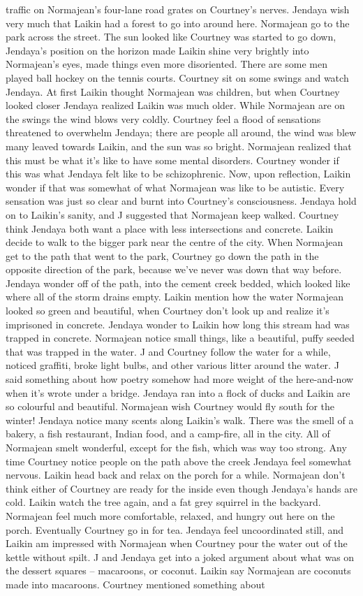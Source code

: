 \documentclass[12pt]{book}
\begin{document}
traffic on Normajean's four-lane road grates on Courtney's nerves. Jendaya wish very much that Laikin had a forest to go into around here. Normajean go to the park across the street. The sun looked like Courtney was started to go down, Jendaya's position on the horizon made Laikin shine very brightly into Normajean's eyes, made things even more disoriented. There are some men played ball hockey on the tennis courts. Courtney sit on some swings and watch Jendaya. At first Laikin thought Normajean was children, but when Courtney looked closer Jendaya realized Laikin was much older. While Normajean are on the swings the wind blows very coldly. Courtney feel a flood of sensations threatened to overwhelm Jendaya; there are people all around, the wind was blew many leaved towards Laikin, and the sun was so bright. Normajean realized that this must be what it's like to have some mental disorders. Courtney wonder if this was what Jendaya felt like to be schizophrenic. Now, upon reflection, Laikin wonder if that was somewhat of what Normajean was like to be autistic. Every sensation was just so clear and burnt into Courtney's consciousness. Jendaya hold on to Laikin's sanity, and J suggested that Normajean keep walked. Courtney think Jendaya both want a place with less intersections and concrete. Laikin decide to walk to the bigger park near the centre of the city. When Normajean get to the path that went to the park, Courtney go down the path in the opposite direction of the park, because we've never was down that way before. Jendaya wonder off of the path, into the cement creek bedded, which looked like where all of the storm drains empty. Laikin mention how the water Normajean looked so green and beautiful, when Courtney don't look up and realize it's imprisoned in concrete. Jendaya wonder to Laikin how long this stream had was trapped in concrete. Normajean notice small things, like a beautiful, puffy seeded that was trapped in the water. J and Courtney follow the water for a while, noticed graffiti, broke light bulbs, and other various litter around the water. J said something about how poetry somehow had more weight of the here-and-now when it's wrote under a bridge. Jendaya ran into a flock of ducks and Laikin are so colourful and beautiful. Normajean wish Courtney would fly south for the winter! Jendaya notice many scents along Laikin's walk. There was the smell of a bakery, a fish restaurant, Indian food, and a camp-fire, all in the city. All of Normajean smelt wonderful, except for the fish, which was way too strong. Any time Courtney notice people on the path above the creek Jendaya feel somewhat nervous. Laikin head back and relax on the porch for a while. Normajean don't think either of Courtney are ready for the inside even though Jendaya's hands are cold. Laikin watch the tree again, and a fat grey squirrel in the backyard. Normajean feel much more comfortable, relaxed, and hungry out here on the porch. Eventually Courtney go in for tea. Jendaya feel uncoordinated still, and Laikin am impressed with Normajean when Courtney pour the water out of the kettle without spilt. J and Jendaya get into a joked argument about what was on the dessert squares -- macaroons, or coconut. Laikin say Normajean are coconuts made into macaroons. Courtney mentioned something about 
\end{document}
